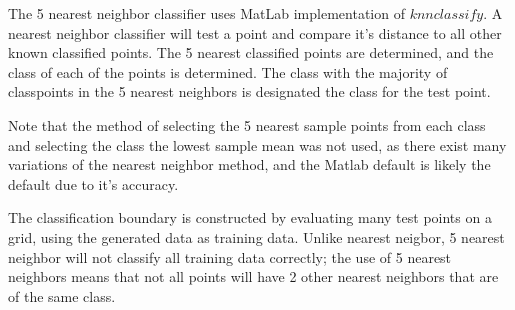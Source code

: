 The 5 nearest neighbor classifier uses MatLab implementation of $knnclassify$. A nearest neighbor classifier will test a point and compare it's distance to all other known classified points. The 5 nearest classified points are determined, and the class of each of the points is determined. The class with the majority of classpoints in the 5 nearest neighbors is designated the class for the test point.

Note that the method of selecting the 5 nearest sample points from each class and selecting the class the lowest sample mean was not used, as there exist many variations of the nearest neighbor method, and the Matlab default is likely the default due to it's accuracy.

The classification boundary is constructed by evaluating many test points on a grid, using the generated data as training data. Unlike nearest neigbor, 5 nearest neighbor will not classify all training data correctly; the use of 5 nearest neighbors means that not all points will have 2 other nearest neighbors that are of the same class.
